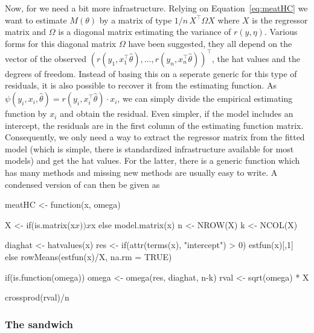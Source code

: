 \documentclass{Z}
\begin{document}
Now, for  we need a bit more infrastructure. Relying on Equation~\ref{eq:meatHC}
we want to estimate $M(\theta)$ by a matrix of type $1/n \, X^\top \Omega X$ where $X$
is the regressor matrix and $\Omega$ is a diagonal matrix estimating the variance of $r(y, \eta)$.
Various forms for this diagonal matrix $\Omega$ have been suggested, they all depend on
the vector of the observed $(r(y_1, x_1^\top \hat \theta), \dots, r(y_n, x_n^\top \hat \theta))^\top$,
the hat values and the degrees of freedom. Instead of basing this on a seperate generic
for this type of residuals, it is also possible to recover it from the estimating function.
As $\psi(y_i, x_i, \hat \theta) = r(y_i, x_i^\top \hat \theta) \cdot x_i$, we can simply 
divide the empirical estimating function by $x_i$ and obtain the residual. Even simpler,
if the model includes an intercept, the residuals are in the first column of the estimating
function matrix. Consequently, we only need a way to extract the regressor matrix from
the fitted model (which is simple, there is standardized infrastructure available for
most models) and get the hat values. For the latter, there is a generic function
 which has many methods and missing new methods are usually easy to
write. A condensed version of  can then be given as
\begin{Schunk}
\begin{Sinput}
meatHC <- function(x, omega)
{
  X <- if(is.matrix(x$x)) x$x else model.matrix(x)
  n <- NROW(X)
  k <- NCOL(X)

  diaghat <- hatvalues(x)
  res <- if(attr(terms(x), "intercept") > 0) estfun(x)[,1]
           else rowMeans(estfun(x)/X, na.rm = TRUE)
  
  if(is.function(omega)) omega <- omega(res, diaghat, n-k)
  rval <- sqrt(omega) * X
  
  crossprod(rval)/n
}
\end{Sinput}
\end{Schunk}



\subsubsection*{The sandwich}
\end{document}
